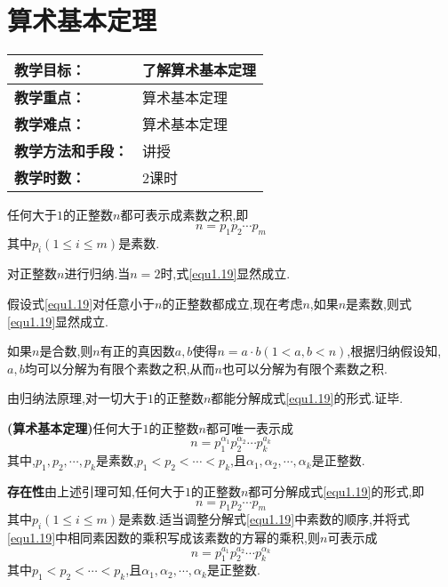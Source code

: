 \section{算术基本定理}
\begin{table}[htb]
	\centering  
	\begin{tabular}{p{32mm}|p{95.6mm}}
		\hline 
		\textbf{教学目标：}       & 了解算术基本定理  \\ \hline
		\textbf{教学重点：}       & 算术基本定理 \\ \hline
		\textbf{教学难点：}       & 算术基本定理\\ \hline
		\textbf{教学方法和手段：} & 讲授  \\ \hline
		\textbf{教学时数：}       & 2课时 \\ \hline
	\end{tabular}
\end{table}
\lemma 任何大于$1$的正整数$n$都可表示成素数之积,即
\begin{equation}\label{equ1.19}
	n=p_{1} p_{2} \cdots p_{m}
\end{equation}
其中$p_{i}(1 \leqslant i \leqslant m)$是素数.

\proof 对正整数$n$进行归纳.当$n=2$时,式\eqref{equ1.19}显然成立.

假设式\eqref{equ1.19}对任意小于$n$的正整数都成立,现在考虑$n$,如果$n$是素数,则式\eqref{equ1.19}显然成立.

如果$n$是合数,则$n$有正的真因数$a, b$使得$n=a \cdot b(1<a, b<n)$,根据归纳假设知,$a, b$均可以分解为有限个素数之积,从而$n$也可以分解为有限个素数之积.

由归纳法原理,对一切大于$1$的正整数$n$都能分解成式\eqref{equ1.19}的形式.证毕.

\theorem \textbf{(算术基本定理)}任何大于$1$的正整数$n$都可唯一表示成
\begin{equation}\label{equ1.20}
	n=p_{1}^{\alpha_{1}} p_{2}^{\alpha_{2}} \cdots p_{k}^{a_{k}}
\end{equation}
其中,$p_{1}, p_{2}, \cdots, p_{k}$是素数,$p_{1}<p_{2}<\cdots<p_{k}$,且$\alpha_{1}, \alpha_{2}, \cdots, \alpha_{k}$是正整数.

\proof \textbf{存在性}\quad 由上述引理可知,任何大于$1$的正整数$n$都可分解成式\eqref{equ1.19}的形式,即
\begin{equation*}
	n=p_{1} p_{2} \cdots p_{m}
\end{equation*}
其中$p_{i}(1 \leqslant i \leqslant m)$是素数.适当调整分解式\eqref{equ1.19}中素数的顺序,并将式\eqref{equ1.19}中相同素因数的乘积写成该素数的方幂的乘积,则$n$可表示成
\begin{equation*}
	n=p_{1}^{a_{1}} p_{2}^{a_{2}} \cdots p_{k}^{\alpha_{k}}
\end{equation*}
其中$p_{1}<p_{2}<\cdots<p_{k}$,且$\alpha_{1}, \alpha_{2}, \cdots, \alpha_{k}$是正整数.

